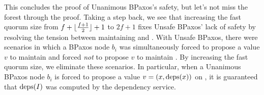 This concludes the proof of Unanimous BPaxos's safety, but let's not miss the
forest through the proof. Taking a step back, we see that increasing the fast
quorum size from $f + \lfloor\frac{f + 1}{2}\rfloor + 1$ to $2f + 1$ fixes Unsafe BPaxos' lack of
safety by resolving the tension between maintaining 
and . With Unsafe BPaxos, there were scenarios in
which a BPaxos node $b_i$ was simultaneously forced to propose a value $v$ to
maintain  and forced \emph{not} to propose $v$ to
maintain . By increasing the fast quorum size, we
eliminate these scenarios.  In particular, when a Unanimous BPaxos node $b_i$
is forced to propose a value $v = (x, \text{deps}(x))$ on
, it is guaranteed that $\text{deps}(I)$ was
computed by the dependency service.
